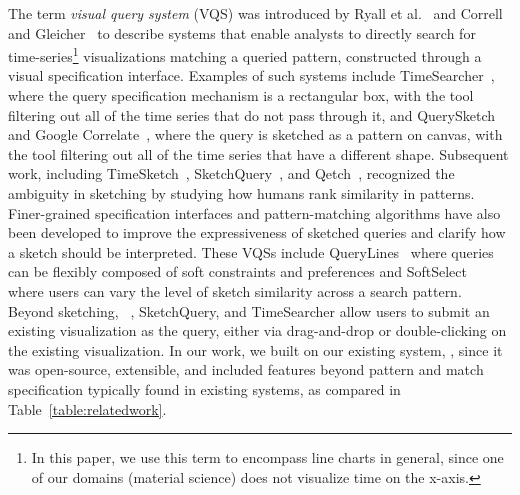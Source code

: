   \npar The term \emph{visual query system} (VQS) was introduced by Ryall et al.~\cite{ryall2005querylines} and Correll and Gleicher~\cite{correll2016semantics} to describe systems that enable analysts to directly search for time-series\footnote{In this paper, we use this term to encompass line charts in general, since one of our domains (material science) does not visualize time on the x-axis.} visualizations matching a queried pattern, constructed through a visual specification interface. Examples of such systems include TimeSearcher~\cite{Hochheiser2001,Hochheiser2004}, where the query specification mechanism is a rectangular box, with the tool filtering out all of the time series that do not pass through it, and QuerySketch~\cite{wattenberg2001sketching} and Google Correlate~\cite{mohebbi2011google}, where the query is sketched as a pattern on canvas, with the tool filtering out all of the time series that have a different shape. Subsequent work, including TimeSketch~\cite{Eichmann2015}, SketchQuery~\cite{correll2016semantics}, and Qetch~\cite{Mannino2018}, recognized the ambiguity in sketching by studying how humans rank similarity in patterns. Finer-grained specification interfaces and pattern-matching algorithms have also been developed to improve the expressiveness of sketched queries and clarify how a sketch should be interpreted. These VQSs include QueryLines~\cite{ryall2005querylines} where queries can be flexibly composed of soft constraints and preferences and SoftSelect~\cite{Holz2009} where users can vary the level of sketch similarity across a search pattern. Beyond sketching, \zv~\cite{Siddiqui2017,Siddiqui2017VLDB}, SketchQuery, and TimeSearcher allow users to submit an existing visualization as the query, either via drag-and-drop or double-clicking on the existing visualization. In our work, we built on our existing system, \zv, since it was open-source, extensible, and included features beyond pattern and match specification typically found in existing systems, as compared in Table~\ref{table:relatedwork}. %
